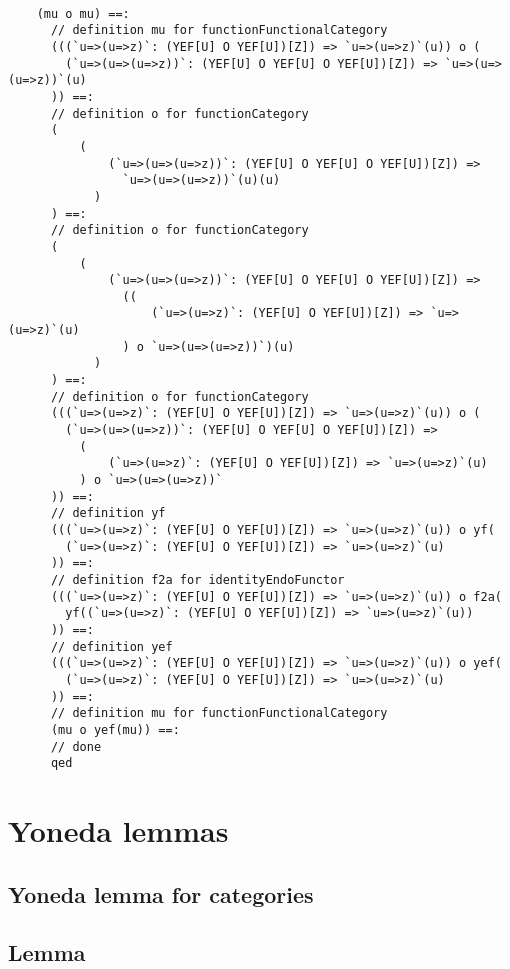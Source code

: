 \documentclass[11pt]{article}
\newcommand{\lemm}{\subsection{Lemma}\begingroup\rm}
\def\edefn{\endgroup\par\pagebreak[2]\addvspace{\medskipamount}}
\let\ecode=\edefn
\begin{document}
\begin{mdframed}[backgroundcolor=lightgray!20] 
\begin{lstlisting}
    
    (mu o mu) ==:
      // definition mu for functionFunctionalCategory
      (((`u=>(u=>z)`: (YEF[U] O YEF[U])[Z]) => `u=>(u=>z)`(u)) o (
        (`u=>(u=>(u=>z))`: (YEF[U] O YEF[U] O YEF[U])[Z]) => `u=>(u=>(u=>z))`(u)
      )) ==:
      // definition o for functionCategory
      (
          (
              (`u=>(u=>(u=>z))`: (YEF[U] O YEF[U] O YEF[U])[Z]) =>
                `u=>(u=>(u=>z))`(u)(u)
            )
      ) ==:
      // definition o for functionCategory
      (
          (
              (`u=>(u=>(u=>z))`: (YEF[U] O YEF[U] O YEF[U])[Z]) =>
                ((
                    (`u=>(u=>z)`: (YEF[U] O YEF[U])[Z]) => `u=>(u=>z)`(u)
                ) o `u=>(u=>(u=>z))`)(u)
            )
      ) ==:
      // definition o for functionCategory
      (((`u=>(u=>z)`: (YEF[U] O YEF[U])[Z]) => `u=>(u=>z)`(u)) o (
        (`u=>(u=>(u=>z))`: (YEF[U] O YEF[U] O YEF[U])[Z]) =>
          (
              (`u=>(u=>z)`: (YEF[U] O YEF[U])[Z]) => `u=>(u=>z)`(u)
          ) o `u=>(u=>(u=>z))`
      )) ==:
      // definition yf
      (((`u=>(u=>z)`: (YEF[U] O YEF[U])[Z]) => `u=>(u=>z)`(u)) o yf(
        (`u=>(u=>z)`: (YEF[U] O YEF[U])[Z]) => `u=>(u=>z)`(u)
      )) ==:
      // definition f2a for identityEndoFunctor
      (((`u=>(u=>z)`: (YEF[U] O YEF[U])[Z]) => `u=>(u=>z)`(u)) o f2a(
        yf((`u=>(u=>z)`: (YEF[U] O YEF[U])[Z]) => `u=>(u=>z)`(u))
      )) ==:
      // definition yef
      (((`u=>(u=>z)`: (YEF[U] O YEF[U])[Z]) => `u=>(u=>z)`(u)) o yef(
        (`u=>(u=>z)`: (YEF[U] O YEF[U])[Z]) => `u=>(u=>z)`(u)
      )) ==:
      // definition mu for functionFunctionalCategory
      (mu o yef(mu)) ==:
      // done
      qed
\end{lstlisting}
\end{mdframed}    
\ecode

\section{Yoneda lemmas}\label{sec:lemmas}

\setcounter{subsection}{0}

\subsection{Yoneda lemma for categories}

\lemm\label{Yoneda lemma for categories}
\end{document}
